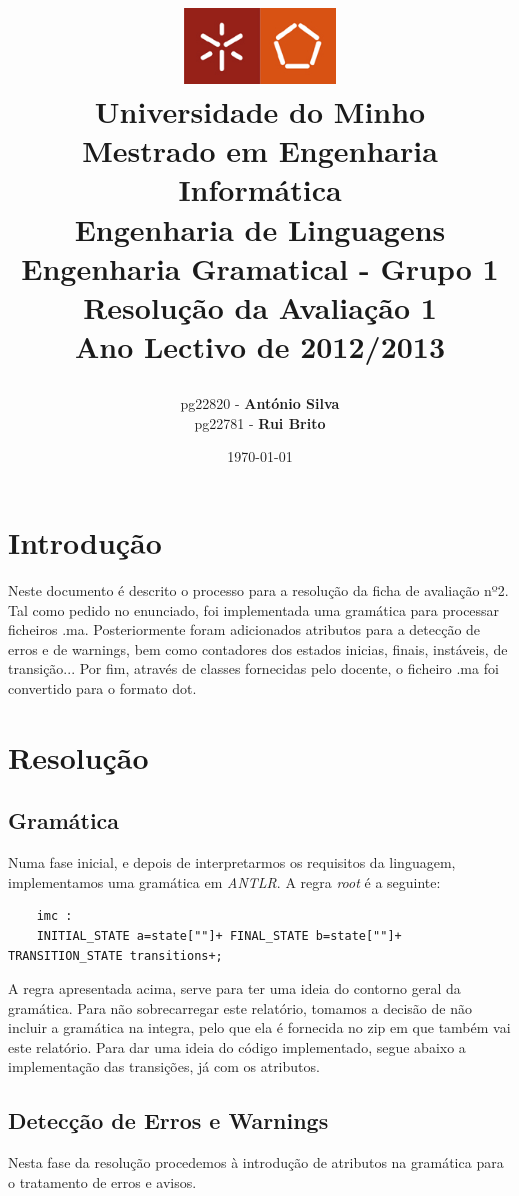 \documentclass[a4paper,11pt,openright,openbib]{article}
\title{
	\large{\includegraphics[width=0.3\textwidth]{UM.jpg}} \\
	\large{Universidade do Minho}  \\
	\large{Mestrado em Engenharia Informática}  \\
	\large{Engenharia de Linguagens}  \\
	\large{Engenharia Gramatical - Grupo 1}  \\	
	\large{\textbf{Resolução da Avaliação 1}} \\
	\large{Ano Lectivo de 2012/2013} \\
	\date{\today}
}
\author{	
	\begin{tabular}[t]{c c}      
        pg22820 - \textbf{António Silva} \\        
		pg22781 - \textbf{Rui Brito} \\   				
	\\ 
	\end{tabular}
}
\begin{document}
\maketitle


\pagestyle{headings}
\newpage
\tableofcontents
\newpage

\section{Introdução}
Neste documento é descrito o processo para a resolução da ficha de avaliação nº2. Tal como pedido no enunciado, foi implementada uma gramática para processar ficheiros .ma. Posteriormente foram adicionados atributos para a detecção de erros e de warnings, bem como contadores dos estados inicias, finais, instáveis, de transição... Por fim, através de classes fornecidas pelo docente, o ficheiro .ma foi convertido para o formato dot.

\section{Resolução} %
\label{sec:resolucao}

\subsection{Gramática} %
\label{sub:gram_tica}

Numa fase inicial, e depois de interpretarmos os requisitos da linguagem, implementamos uma gramática em \emph{ANTLR}.
A regra \emph{root} é a seguinte:
\small
\begin{verbatim}
	imc	:	
    INITIAL_STATE a=state[""]+ FINAL_STATE b=state[""]+ TRANSITION_STATE transitions+;
\end{verbatim}

A regra apresentada acima, serve para ter uma ideia do contorno geral da gramática. Para não sobrecarregar este relatório, tomamos a decisão de não incluir a gramática na integra, pelo que ela é fornecida no zip em que também vai este relatório. Para dar uma ideia do código implementado, segue abaixo a implementação das transições, já com os atributos.

\normalsize

\subsection{Detecção de Erros e Warnings} %
\label{sub:detec_o_de_erros_e_warnings}
Nesta fase da resolução procedemos à introdução de atributos na gramática para o tratamento de erros e avisos. 
\end{document}
